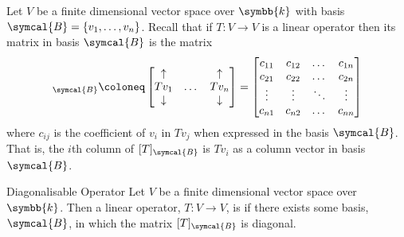 \documentclass[fleqn]{NotesClass}
\renewcommand{\field}{\symbb{k}}
\begin{document}
    Let \(V\) be a finite dimensional vector space over \(\field\) with basis \(\symcal{B} = \{v_1, \dotsc, v_n\}\).
    Recall that if \(T \colon V \to V\) is a linear operator then its matrix in basis \(\symcal{B}\) is the matrix
    \begin{equation}
        [T]_{\symcal{B}} \coloneq 
        \begin{bmatrix}
            \uparrow & & \uparrow \\
            Tv_1 & \dots & Tv_n \\
            \downarrow & & \downarrow
        \end{bmatrix}
        =
        \begin{bmatrix}
            c_{11} & c_{12} & \dots & c_{1n}\\
            c_{21} & c_{22} & \dots & c_{2n}\\
            \vdots & \vdots & \ddots & \vdots\\
            c_{n1} & c_{n2} & \dots & c_{nn}
        \end{bmatrix}
    \end{equation}
    where \(c_{ij}\) is the coefficient of \(v_i\) in \(Tv_j\) when expressed in the basis \(\symcal{B}\).
    That is, the \(i\)th column of \([T]_{\symcal{B}}\) is \(Tv_i\) as a column vector in basis \(\symcal{B}\).
    
    \begin{dfn}{Diagonalisable Operator}{}
        Let \(V\) be a finite dimensional vector space over \(\field\).
        Then a linear operator, \(T \colon V \to V\), is  if there exists some basis, \(\symcal{B}\), in which the matrix \([T]_{\symcal{B}}\) is diagonal.
    \end{dfn}
    
\end{document}
